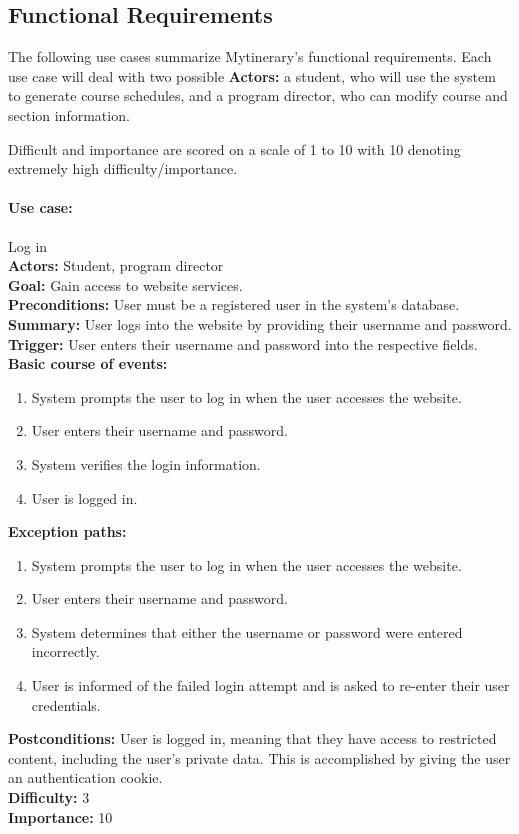 \documentclass[12pt]{article}
\begin{document}
\subsection{Functional Requirements}
The following use cases summarize Mytinerary's functional requirements. Each
use case will deal with two possible \textbf{Actors:} a student, who will use the
system to generate course schedules, and a program director, who can modify
course and section information.

Difficult and importance are scored on a scale of 1 to 10 with 10 denoting extremely high difficulty/importance.\\

\paragraph*{Use case:} Log in\\
\textbf{Actors:} Student, program director\\
\textbf{Goal:} Gain access to website services.\\
\textbf{Preconditions:} User must be a registered user in the system's database.\\
\textbf{Summary:} User logs into the website by providing their username and password.\\
\textbf{Trigger:} User enters their username and password into the respective fields.\\
\textbf{Basic course of events:}
\begin{enumerate}
\item System prompts the user to log in when the user accesses the website.
\item User enters their username and password.
\item System verifies the login information.
\item User is logged in.
\end{enumerate}
\textbf{Exception paths:}
\begin{enumerate}
\item System prompts the user to log in when the user accesses the website.
\item User enters their username and password.
\item System determines that either the username or password were entered incorrectly.
\item User is informed of the failed login attempt and is asked to re-enter their
user credentials.
\end{enumerate}
\textbf{Postconditions:} User is logged in, meaning that they have access to restricted content, including the user's private data. This is accomplished by giving the user an authentication cookie.\\
\textbf{Difficulty:} 3\\
\textbf{Importance:} 10\\
\end{document}
